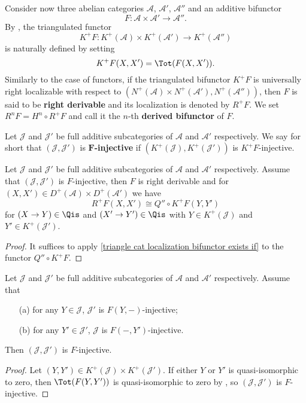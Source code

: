 Consider now three abelian categories $\mathcal{A}$, $\mathcal{A}'$, $\mathcal{A}''$ and an additive bifunctor
\[F:\mathcal{A}\times\mathcal{A}'\to\mathcal{A}''.\]
By \cite[Proposition 11.6.3]{kashiwara_SAC}, the triangulated functor
\[K^+F:K^+(\mathcal{A})\times K^+(\mathcal{A}')\to K^+(\mathcal{A}'')\]
is naturally defined by setting
\[K^+F(X,X')=\Tot(F(X,X')).\]
Similarly to the case of functors, if the triangulated bifunctor $K^+F$ is universally right localizable with respect to $(N^+(\mathcal{A})\times N^+(\mathcal{A}'),N^+(\mathcal{A}''))$, then $F$ is said to be \textbf{right derivable} and its localization is denoted by $R^+F$. We set $R^nF=H^n\circ R^+F$ and call it the $n$-th \textbf{derived bifunctor} of $F$.

\begin{definition}
Let $\mathcal{J}$ and $\mathcal{J}'$ be full additive subcategories of $\mathcal{A}$ and $\mathcal{A}'$ respectively. We say for short that $(\mathcal{J},\mathcal{J}')$ is \textbf{$\bm{F}$-injective} if $(K^+(\mathcal{J}),K^+(\mathcal{J}'))$ is $K^+F$-injective.
\end{definition}

\begin{proposition}\label{derived category bifunctor derive exists if}
Let $\mathcal{J}$ and $\mathcal{J}'$ be full additive subcategories of $\mathcal{A}$ and $\mathcal{A}'$ respectively. Assume that $(\mathcal{J},\mathcal{J}')$ is $F$-injective, then $F$ is right derivable and for $(X,X')\in D^+(\mathcal{A})\times D^+(\mathcal{A}')$ we have
\[R^+F(X,X')\cong Q''\circ K^+F(Y,Y')\]
for $(X\to Y)\in\Qis$ and $(X'\to Y')\in\Qis$ with $Y\in K^+(\mathcal{J})$ and $Y'\in K^+(\mathcal{J}')$.
\end{proposition}
\begin{proof}
It suffices to apply \cref{triangle cat localization bifunctor exists if} to the functor $Q''\circ K^+F$.
\end{proof}

\begin{proposition}\label{derived category bifunctor F-injective if separate}
Let $\mathcal{J}$ and $\mathcal{J}'$ be full additive subcategories of $\mathcal{A}$ and $\mathcal{A}'$ respectively. Assume that 
\begin{enumerate}
    \item[(a)] for any $Y\in\mathcal{J}$, $\mathcal{J}'$ is $F(Y,-)$-injective;
    \item[(b)] for any $Y'\in\mathcal{J}'$, $\mathcal{J}$ is $F(-,Y')$-injective.
\end{enumerate}
Then $(\mathcal{J},\mathcal{J}')$ is $F$-injective.
\end{proposition}
\begin{proof}
Let $(Y,Y')\in K^+(\mathcal{J})\times K^+(\mathcal{J}')$. If either $Y$ or $Y'$ is quasi-isomorphic to zero, then $\Tot(F(Y,Y'))$ is quasi-isomorphic to zero by \cite[Proposition 12.5.5]{kashiwara_SAC}, so $(\mathcal{J},\mathcal{J}')$ is $F$-injective.
\end{proof}

